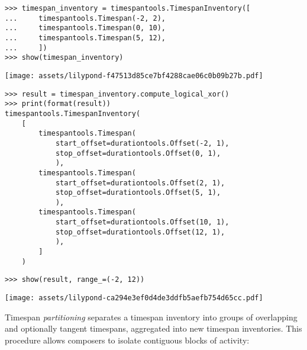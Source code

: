 \begin{abjadbookoutput}
\begin{singlespacing}
\vspace{-0.5\baselineskip}
\begin{verbatim}
>>> timespan_inventory = timespantools.TimespanInventory([
...     timespantools.Timespan(-2, 2),
...     timespantools.Timespan(0, 10),
...     timespantools.Timespan(5, 12),
...     ])
>>> show(timespan_inventory)
\end{verbatim}
\noindent\texttt{[image: assets/lilypond-f47513d85ce7bf4288cae06c0b09b27b.pdf]}
\begin{verbatim}
>>> result = timespan_inventory.compute_logical_xor()
>>> print(format(result))
timespantools.TimespanInventory(
    [
        timespantools.Timespan(
            start_offset=durationtools.Offset(-2, 1),
            stop_offset=durationtools.Offset(0, 1),
            ),
        timespantools.Timespan(
            start_offset=durationtools.Offset(2, 1),
            stop_offset=durationtools.Offset(5, 1),
            ),
        timespantools.Timespan(
            start_offset=durationtools.Offset(10, 1),
            stop_offset=durationtools.Offset(12, 1),
            ),
        ]
    )
\end{verbatim}
\begin{verbatim}
>>> show(result, range_=(-2, 12))
\end{verbatim}
\noindent\texttt{[image: assets/lilypond-ca294e3ef0d4de3ddfb5aefb754d65cc.pdf]}
\end{singlespacing}
\end{abjadbookoutput}

\noindent Timespan \emph{partitioning} separates a timespan inventory into
groups of overlapping and optionally tangent timespans, aggregated into new
timespan inventories. This procedure allows composers to isolate contiguous
blocks of activity:

\begin{comment}
<abjad>
timespan_inventory = timespantools.TimespanInventory([
    timespantools.Timespan(0, 10),
    timespantools.Timespan(5, 15),
    timespantools.Timespan(15, 20),
    timespantools.Timespan(25, 30),
    ])
show(timespan_inventory)
for shard in timespan_inventory.partition():
    show(shard, range_=(0, 30))

for shard in timespan_inventory.partition(include_tangent_timespans=True):
    show(shard, range_=(0, 30))

</abjad>
\end{comment}

